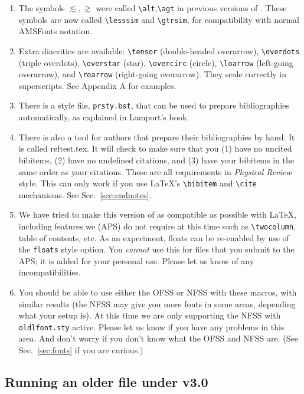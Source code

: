 \begin{enumerate}
\item The symbols $\lesssim,\gtrsim$ were called \verb+\alt+,\verb+\agt+ in
previous versions of \REVTeX{}. These symbols are now called
\verb+\lesssim+ and \verb+\gtrsim+, for compatibility with normal AMSFonts
notation.

\item Extra diacritics are available: \verb+\tensor+ (double-headed
overarrow), \verb+\overdots+ (triple overdots), \verb+\overstar+ (star),
\verb+\overcirc+ (circle), \verb+\loarrow+ (left-going overarrow), and
\verb+\roarrow+ (right-going overarrow). They scale correctly in
superscripts. See Appendix A for examples.

\item There is a \BibTeX{} style file, \verb+prsty.bst+, that can be used
to prepare bibliographies automatically, as explained in Lamport's book.

\item There is also a tool for authors that prepare their bibliographies by
hand. It is called reftest.tex. It will check to make sure that you (1)
have no uncited bibitems, (2) have no undefined citations, and (3) have
your bibitems in the same order as your citations. These are all
requirements in {\it Physical Review\/} style. This can only work if you
use \LaTeX{}'s \verb+\bibitem+ and \verb+\cite+ mechanisms. See Sec.\
\ref{sec:endnotes}.

\item We have tried to make this version of \REVTeX{} as compatible as
possible with \LaTeX{}, including features we (APS) do not require at this
time such as \verb+\twocolumn+, table of contents, etc. As an experiment,
floats can be re-enabled by use of the \verb+floats+ style option. You {\em
cannot\/} use this for files that you submit to the APS; it is added for
your personal use. Please let us know of any incompatibilities.

\item You should be able to use either the OFSS or NFSS with these macros,
with similar results (the NFSS may give you more fonts in some areas,
depending what your setup is). At this time we are only supporting the NFSS
with \verb+oldlfont.sty+ active. Please let us know if you have any
problems in this area. And don't worry if you don't know what the OFSS and
NFSS are. (See Sec.\ \ref{sec:fonts} if you are curious.)
\end{enumerate}



\subsection{Running an older \REVTeX{} file under \REVTeX{} v3.0}

